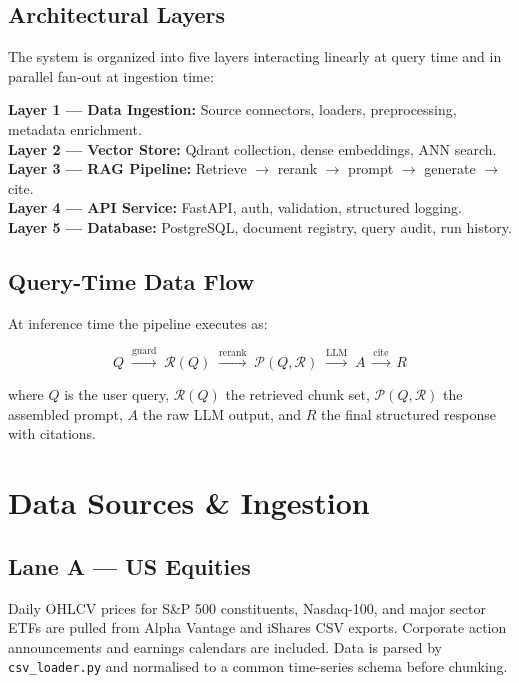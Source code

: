 \documentclass[10pt,a4paper,twocolumn]{article}
\begin{document}
\subsection{Architectural Layers}

The system is organized into five layers interacting linearly at query time and in parallel
fan-out at ingestion time:

\begin{infobox}
\scriptsize
\textbf{Layer 1 --- Data Ingestion:} Source connectors, loaders, preprocessing, metadata enrichment.\\
\textbf{Layer 2 --- Vector Store:} Qdrant collection, dense embeddings, ANN search.\\
\textbf{Layer 3 --- RAG Pipeline:} Retrieve $\to$ rerank $\to$ prompt $\to$ generate $\to$ cite.\\
\textbf{Layer 4 --- API Service:} FastAPI, auth, validation, structured logging.\\
\textbf{Layer 5 --- Database:} PostgreSQL, document registry, query audit, run history.
\end{infobox}

\subsection{Query-Time Data Flow}

At inference time the pipeline executes as:

\[
Q \;\xrightarrow{\text{guard}}\; \mathcal{R}(Q) \;\xrightarrow{\text{rerank}}\;
\mathcal{P}(Q,\mathcal{R}) \;\xrightarrow{\text{LLM}}\; A \;\xrightarrow{\text{cite}}\; R
\]

where $Q$ is the user query, $\mathcal{R}(Q)$ the retrieved chunk set,
$\mathcal{P}(Q,\mathcal{R})$ the assembled prompt, $A$ the raw LLM output,
and $R$ the final structured response with citations.

\section{Data Sources \& Ingestion}

\subsection{Lane A --- US Equities}

Daily OHLCV prices for S\&P 500 constituents, Nasdaq-100, and major sector ETFs are pulled
from Alpha Vantage and iShares CSV exports. Corporate action announcements and earnings
calendars are included. Data is parsed by \texttt{csv\_loader.py} and normalised to a
common time-series schema before chunking.
\end{document}
